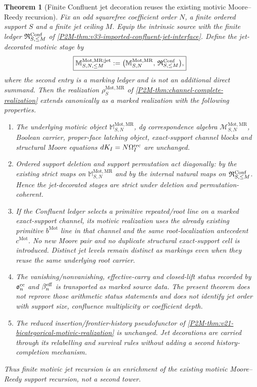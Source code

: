 \documentclass[11pt]{article}
\newtheorem{theorem}{Theorem}[section]
\theoremstyle{remark}
\newcommand{\Mot}{\mathrm{Mot}}
\newcommand{\MR}{\mathrm{MR}}
\begin{document}
\begin{theorem}[Finite Confluent jet decoration reuses the existing motivic Moore--Reedy recursion]
\label{P2M-thm:v33-confluent-jet-decoration}
Fix an odd squarefree coefficient order $N$, a finite ordered support $S$ and a
finite jet ceiling $M$.  Equip the intrinsic source with the finite ledger
$\mathfrak R^{\rm Conf}_{S,\le M}$ of
\cref{P2M-thm:v33-imported-confluent-jet-interface}.  Define the jet-decorated
motivic stage by
\begin{equation}
 \boxed{
 \mathbb M_{S,N,\le M}^{\Mot,\MR;\rm jet}
 :=
 \bigl(\mathbb M_{S,N}^{\Mot,\MR},\,
       \mathfrak R^{\rm Conf}_{S,\le M}\bigr),}
 \label{P2M-eq:v33-jet-decorated-motivic-stage}
\end{equation}
where the second entry is a marking ledger and is not an additional direct
summand.  Then the realization
$\rho_S^{\Mot,\MR}$ of \cref{P2M-thm:channel-complete-realization} extends
canonically as a marked realization with the following properties.
\begin{enumerate}[label=\textup{(\roman*)}]
\item The underlying motivic object $\mathbb M_{S,N}^{\Mot,\MR}$, dg
correspondence algebra $\mathscr M_{S,N}^{\Mot,\MR}$, Boolean carrier,
proper-face latching object, exact-support channel blocks and structural Moore
equations $dK_I=N\Omega_I^{\rm rec}$ are unchanged.
\item Ordered support deletion and support permutation act diagonally: by the
existing strict maps on $\mathbb M_{S,N}^{\Mot,\MR}$ and by the internal natural
maps on $\mathfrak R^{\rm Conf}_{S,\le M}$.  Hence the jet-decorated stages are
strict under deletion and permutation-coherent.
\item If the Confluent ledger selects a primitive repeated/root line on a marked
exact-support channel, its motivic realization uses the already existing
primitive $b^{\Mot}$ line in that channel and the same root-localization
antecedent $c^{\Mot}$.  No new Moore pair and no duplicate structural
exact-support cell is introduced.  Distinct jet levels remain distinct as
markings even when they reuse the same underlying root carrier.
\item The vanishing/nonvanishing, effective-carry and closed-lift status
recorded by $\mathfrak o_n^{\rm cc}$ and $\beta_n^{\rm eff}$ is transported as
marked source data.  The present theorem does not reprove those arithmetic
status statements and does not identify jet order with support size,
confluence multiplicity or coefficient depth.
\item The reduced insertion/frontier-history pseudofunctor of
\cref{P2M-thm:v21-bicategorical-motivic-realization} is unchanged.  Jet decorations
are carried through its relabelling and survival rules without adding a second
history-completion mechanism.
\end{enumerate}
Thus finite motivic jet recursion is an enrichment of the existing motivic
Moore--Reedy support recursion, not a second tower.
\end{theorem}
\end{document}

